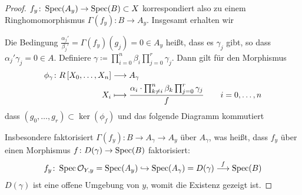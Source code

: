 \begin{Lemma}
\begin{proof}
    $f_y\colon\operatorname{Spec}(A_y)\to\operatorname{Spec}(B)\subset X$
    korrespondiert also zu einem Ringhomomorphismus
    $\Gamma(f_y)\colon B\to A_y$.
    Insgesamt erhalten wir
    \begin{center}
    \end{center}
    Die Bedingung $\frac{\alpha_j'}{\beta_j'}=\Gamma(f_y)(g_j)=0\in A_y$
    heißt, dass es $\gamma_j$ gibt, so dass
    $\alpha_j'\gamma_j=0\in A$.
    Definiere
    $\gamma\coloneqq \prod_{i=0}^n \beta_i \prod_{j=0}^r \gamma_j$.
    Dann gilt für den Morphismus
    \begin{align*}
      \phi_\gamma\colon
      R\left[X_0,\dotsc, X_n\right]
      &\longrightarrow
        A_\gamma\\
      X_i
      &\longmapsto
        \dfrac{
        \alpha_i\cdot
        \prod_{k\neq i}^n \beta_k
        \prod_{j=0}^r \gamma_j
        }{f}
        \qquad i=0,\dotsc,n
    \end{align*}
    dass $(g_0, \dotsc, g_r)\subset\ker(\phi_f)$ und das folgende
    Diagramm kommutiert
    \begin{center}
    \end{center}
    Insbesondere faktorisiert $\Gamma(f_y)\colon B\to A_\gamma\to A_y$
    über $A_\gamma$, was heißt, dass $f_y$ über einen Morphismus
    $f\colon D(\gamma)\to\operatorname{Spec}(B)$ faktorisiert:
    \begin{gather*}
      f_y\colon
      \operatorname{Spec}\mathcal{O}_{Y,y}=\operatorname{Spec}(A_y)
      \hookrightarrow \operatorname{Spec}(A_\gamma)=D(\gamma)
      \overset{f}{\longrightarrow} \operatorname{Spec}(B)
    \end{gather*}
    $D(\gamma)$ ist eine offene Umgebung von $y$, womit die Existenz
    gezeigt ist.
  \end{proof}
\end{Lemma}


